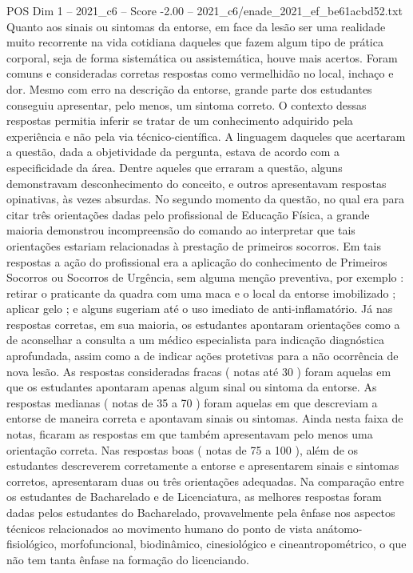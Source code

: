 \begin{textsample}{POS Dim 1 – 2021\_c6 – Score -2.00 – 2021\_c6/enade\_2021\_ef\_be61acbd52.txt}
Quanto aos sinais ou sintomas da entorse, em face da lesão ser uma realidade muito recorrente na vida cotidiana daqueles que fazem algum tipo de prática corporal, seja de forma sistemática ou assistemática, houve mais acertos.
Foram comuns e consideradas corretas respostas como vermelhidão no local, inchaço e dor.
Mesmo com erro na descrição da entorse, grande parte dos estudantes conseguiu apresentar, pelo menos, um sintoma correto.
O contexto dessas respostas permitia inferir se tratar de um conhecimento adquirido pela experiência e não pela via técnico-científica.
A linguagem daqueles que acertaram a questão, dada a objetividade da pergunta, estava de acordo com a especificidade da área.
Dentre aqueles que erraram a questão, alguns demonstravam desconhecimento do conceito, e outros apresentavam respostas opinativas, às vezes absurdas.
No segundo momento da questão, no qual era para citar três orientações dadas pelo profissional de Educação Física, a grande maioria demonstrou incompreensão do comando ao interpretar que tais orientações estariam relacionadas à prestação de primeiros socorros.
Em tais respostas a ação do profissional era a aplicação do conhecimento de Primeiros Socorros ou Socorros de Urgência, sem alguma menção preventiva, por exemplo : retirar o praticante da quadra com uma maca e o local da entorse imobilizado ; aplicar gelo ; e alguns sugeriam até o uso imediato de anti-inflamatório.
Já nas respostas corretas, em sua maioria, os estudantes apontaram orientações como a de aconselhar a consulta a um médico especialista para indicação diagnóstica aprofundada, assim como a de indicar ações protetivas para a não ocorrência de nova lesão.
As respostas consideradas fracas ( notas até 30 ) foram aquelas em que os estudantes apontaram apenas algum sinal ou sintoma da entorse.
As respostas medianas ( notas de 35 a 70 ) foram aquelas em que descreviam a entorse de maneira correta e apontavam sinais ou sintomas.
Ainda nesta faixa de notas, ficaram as respostas em que também apresentavam pelo menos uma orientação correta.
Nas respostas boas ( notas de 75 a 100 ), além de os estudantes descreverem corretamente a entorse e apresentarem sinais e sintomas corretos, apresentaram duas ou três orientações adequadas.
Na comparação entre os estudantes de Bacharelado e de Licenciatura, as melhores respostas foram dadas pelos estudantes do Bacharelado, provavelmente pela ênfase nos aspectos técnicos relacionados ao movimento humano do ponto de vista anátomo-fisiológico, morfofuncional, biodinâmico, cinesiológico e cineantropométrico, o que não tem tanta ênfase na formação do licenciando.

\end{textsample}
